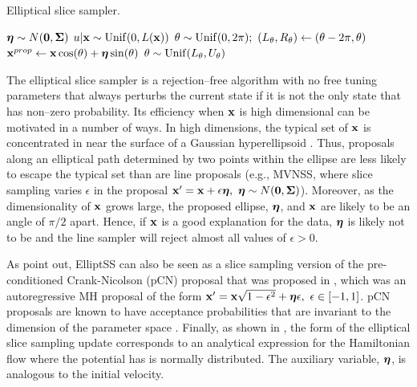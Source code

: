 \begin{algorithm}[htbp]
	\caption{Elliptical slice sampler.}\label{alg:elliptical_slice_sampler}
	\begin{algorithmic}[1]
		\State $ \boldsymbol{\eta} \sim N(\boldsymbol{0}, \boldsymbol{\Sigma}) $ 
		\State $ u|\mathbf{x} \sim \mathrm{Unif}(0, L(\mathbf{x})) $ 
		\State $\theta \sim \mr{Unif}(0,2\pi);\ 
		(L_{\theta}, R_\theta) \gets (\theta - 2\pi, \theta)$ 
		\State $ \mathbf{x} ^{prop}\gets\mathbf{x}\cos(\theta) + \boldsymbol{\eta}\sin(\theta) $ 
		\If{$ L(\prop{\bx}) > u $}{ $ \new{\bx}\gets\prop{\bx} $}\Comment{Accept proposal}
		\State\Return{ $ \new{\bx} $}
		\Else{}
		\EndIf
		\State $ \theta\sim\mathrm{Unif}(L_\theta,U_\theta) $ 
		\State{\textbf{GoTo} 5} 
		\EndIf
		\EndProcedure
	\end{algorithmic}
\end{algorithm}

The elliptical slice sampler is a rejection--free algorithm with no free tuning parameters that always perturbs the current state if it is not the only state that has non--zero probability. Its efficiency when $ \mathbf{x} $ is high dimensional can be motivated in a number of ways. In high dimensions, the typical set of $ \mathbf{x} $ is concentrated in near the surface of a Gaussian hyperellipsoid \cite{betancourt2017conceptual,murray2010}. Thus, proposals along an elliptical path determined by two points within the ellipse are less likely to escape the typical set than are line proposals (e.g., MVNSS, where slice sampling varies $ \epsilon $ in the proposal $ \bx' = \bx + \epsilon\boeta,\ \boeta \sim N(\bs{0},\bSigma)$). Moreover, as the dimensionality of $ \mathbf{x} $ grows large, the proposed ellipse, $ \boldsymbol{\eta} $, and $ \mathbf{x} $ are likely to be an angle of $ \pi/2 $ apart. Hence, if $ \mathbf{x} $ is a good explanation for the data, $ \boldsymbol{\eta} $ is likely not to be and the line sampler will reject almost all values of $ \epsilon>0 $. 

As \cite{murray2010} point out, ElliptSS can also be seen as a slice sampling version of the pre-conditioned Crank-Nicolson (pCN) proposal that was proposed in \cite{neal1998regression}, which was an autoregressive MH proposal of the form  $ \mathbf{x}' = \mathbf{x}\sqrt{1-\epsilon^2} + \boldsymbol{\eta}\epsilon,\ \epsilon\in[-1,1] $. pCN proposals are known to have acceptance probabilities that are invariant to the dimension of the parameter space \cite{cotter2013mcmc}. Finally, as shown in \cite{bloem2016slice}, the form of the elliptical slice sampling update corresponds to an analytical expression for the Hamiltonian flow where the potential has is normally distributed. The auxiliary variable, $ \boldsymbol{\eta} $, is analogous to the initial velocity. 

